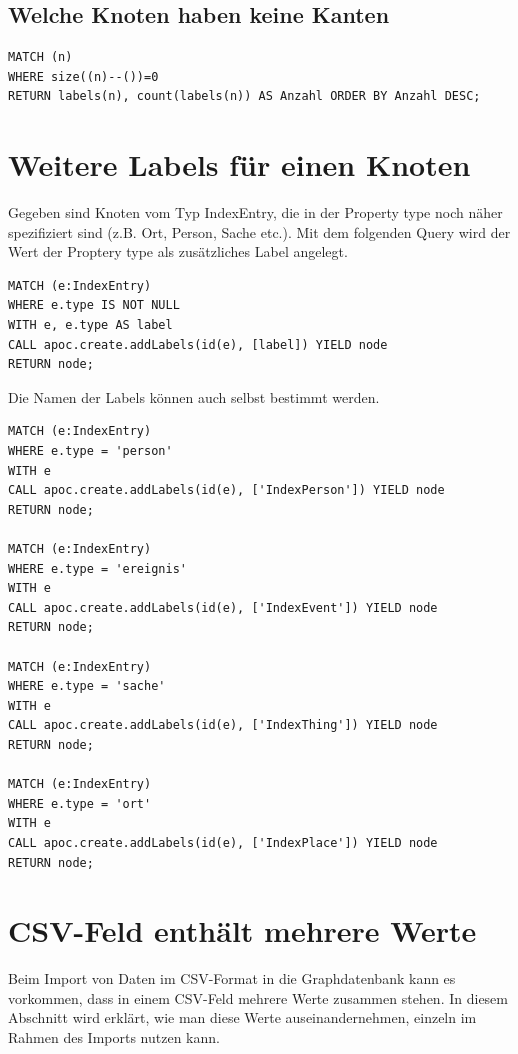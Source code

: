 \documentclass[ngerman,]{scrreprt}
\begin{document}
\subsection{Welche Knoten haben keine Kanten}\label{welche-knoten-haben-keine-kanten}

\begin{verbatim}
MATCH (n)
WHERE size((n)--())=0
RETURN labels(n), count(labels(n)) AS Anzahl ORDER BY Anzahl DESC;
\end{verbatim}

\section{Weitere Labels für einen Knoten}\label{weitere-labels-fuxfcr-einen-knoten}

Gegeben sind Knoten vom Typ IndexEntry, die in der Property type noch näher spezifiziert sind (z.B. Ort, Person, Sache etc.). Mit dem folgenden Query wird der Wert der Proptery type als zusätzliches Label angelegt.

\begin{verbatim}
MATCH (e:IndexEntry)
WHERE e.type IS NOT NULL
WITH e, e.type AS label
CALL apoc.create.addLabels(id(e), [label]) YIELD node
RETURN node;
\end{verbatim}

Die Namen der Labels können auch selbst bestimmt werden.

\begin{verbatim}
MATCH (e:IndexEntry)
WHERE e.type = 'person'
WITH e
CALL apoc.create.addLabels(id(e), ['IndexPerson']) YIELD node
RETURN node;

MATCH (e:IndexEntry)
WHERE e.type = 'ereignis'
WITH e
CALL apoc.create.addLabels(id(e), ['IndexEvent']) YIELD node
RETURN node;

MATCH (e:IndexEntry)
WHERE e.type = 'sache'
WITH e
CALL apoc.create.addLabels(id(e), ['IndexThing']) YIELD node
RETURN node;

MATCH (e:IndexEntry)
WHERE e.type = 'ort'
WITH e
CALL apoc.create.addLabels(id(e), ['IndexPlace']) YIELD node
RETURN node;
\end{verbatim}

\section{CSV-Feld enthält mehrere Werte}\label{csv-feld-enthuxe4lt-mehrere-werte}

Beim Import von Daten im CSV-Format in die Graphdatenbank kann es vorkommen, dass in einem CSV-Feld mehrere Werte zusammen stehen. In diesem Abschnitt wird erklärt, wie man diese Werte auseinandernehmen, einzeln im Rahmen des Imports nutzen kann.
\end{document}
